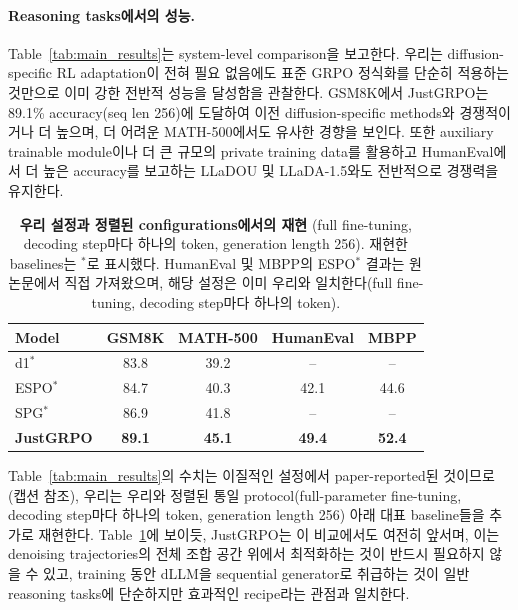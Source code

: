 \paragraph{Reasoning tasks에서의 성능.} Table~\ref{tab:main_results}는 system-level comparison을 보고한다. 우리는 diffusion-specific RL adaptation이 전혀 필요 없음에도 표준 GRPO 정식화를 단순히 적용하는 것만으로 이미 강한 전반적 성능을 달성함을 관찰한다. GSM8K에서 JustGRPO는 89.1\% accuracy(seq len 256)에 도달하여 이전 diffusion-specific methods와 경쟁적이거나 더 높으며, 더 어려운 MATH-500에서도 유사한 경향을 보인다. 또한 auxiliary trainable module이나 더 큰 규모의 private training data를 활용하고 HumanEval에서 더 높은 accuracy를 보고하는 LLaDOU 및 LLaDA-1.5와도 전반적으로 경쟁력을 유지한다.
\begin{table}
    \centering
    \vskip -0.15in
    \caption{\textbf{우리 설정과 정렬된 configurations에서의 재현} (full fine-tuning, decoding step마다 하나의 token, generation length 256). 재현한 baselines는 $^{*}$로 표시했다. HumanEval 및 MBPP의 ESPO$^{*}$ 결과는 원 논문에서 직접 가져왔으며, 해당 설정은 이미 우리와 일치한다(full fine-tuning, decoding step마다 하나의 token).}
    \vskip -0.12in
    \label{tab:controlled_comparison}
    \small
    \setlength{\tabcolsep}{4pt}
    \begin{tabular}{lcccc}
        \toprule
        \textbf{Model} & \textbf{GSM8K} & \textbf{MATH-500} & \textbf{HumanEval} & \textbf{MBPP} \\
        \midrule
        d1$^{*}$           & 83.8 & 39.2 & -- & -- \\
        ESPO$^{*}$         & 84.7 & 40.3 & 42.1 & 44.6 \\
        SPG$^{*}$          & 86.9 & 41.8 & -- & -- \\
        \textbf{JustGRPO}  & \textbf{89.1} & \textbf{45.1} & \textbf{49.4} & \textbf{52.4} \\
        \bottomrule
    \end{tabular}
    \vskip -0.12in
\end{table}
Table~\ref{tab:main_results}의 수치는 이질적인 설정에서 paper-reported된 것이므로(캡션 참조), 우리는 우리와 정렬된 통일 protocol(full-parameter fine-tuning, decoding step마다 하나의 token, generation length 256) 아래 대표 baseline들을 추가로 재현한다.
Table~\ref{tab:controlled_comparison}에 보이듯, JustGRPO는 이 비교에서도 여전히 앞서며, 이는 denoising trajectories의 전체 조합 공간 위에서 최적화하는 것이 반드시 필요하지 않을 수 있고, training 동안 dLLM을 sequential generator로 취급하는 것이 일반 reasoning tasks에 단순하지만 효과적인 recipe라는 관점과 일치한다.

